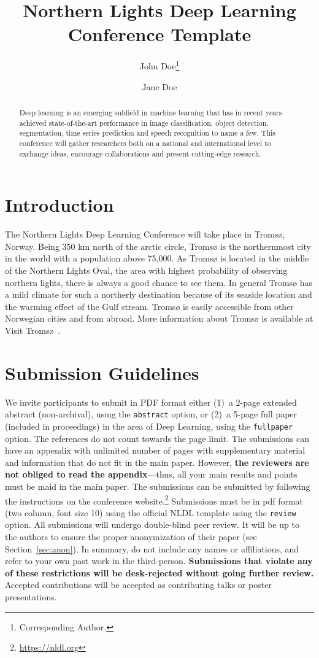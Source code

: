 \documentclass[fullpaper]{nldl}
\title{Northern Lights Deep Learning Conference Template}
\author[1]{John Doe\thanks{Corresponding Author.}}
\author[1,2]{Jane Doe}
\affil[1]{Affiliation 1}
\affil[2]{Affiliation 2}
\affil[ ]{\texttt{\{john.doe, jane.doe\}@affiliation.com}}
\begin{document}
\maketitle

\begin{abstract}
Deep learning is an emerging subfield in machine learning that has in recent years achieved state-of-the-art performance in image classification, object detection, segmentation, time series prediction and speech recognition to name a few.
This conference will gather researchers both on a national and international level to exchange ideas, encourage collaborations and present cutting-edge research.
\end{abstract}

\section{Introduction}
The Northern Lights Deep Learning Conference will take place in Troms{\o}, Norway.
Being 350 km north of the arctic circle, Troms{\o} is the northernmost city in the world with a population above 75,000.
As Troms{\o} is located in the middle of the Northern Lights Oval, the area with highest probability of observing northern lights, there is always a good chance to see them.
In general Troms{\o} has a mild climate for such a northerly destination because of its seaside location and the warming effect of the Gulf stream.
Troms{\o} is easily accessible from other Norwegian cities and from abroad.
More information about Troms{\o} is available at Visit Troms{\o}~\cite{tromso}.

\section{Submission Guidelines}
We invite participants to submit in PDF format either (1)~a 2-page extended abstract (non-archival), using the \verb|abstract| option, or (2)~a 5-page full paper (included in proceedings) in the area of Deep Learning, using the \verb|fullpaper| option.
The references do not count towards the page limit.
The submissions can have an appendix with unlimited number of pages with supplementary material and information that do not fit in the main paper.
However, \textbf{the reviewers are not obliged to read the appendix}---thus, all your main results and points must be maid in the main paper.
The submissions can be submitted by following the instructions on the conference website.\footnote{\url{https://nldl.org}}
Submissions must be in pdf format (two column, font size 10) using the official NLDL template using the \verb|review| option.
All submissions will undergo double-blind peer review.
It will be up to the authors to ensure the proper anonymization of their paper (see Section~\ref{sec:anon}).
In summary, do not include any names or affiliations, and refer to your own past work in the third-person.
\textbf{Submissions that violate any of these restrictions will be desk-rejected without going further review.}
Accepted contributions will be accepted as contributing talks or poster presentations.
\end{document}
